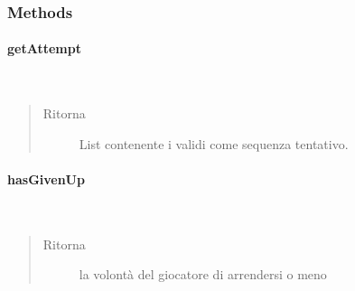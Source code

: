 \documentclass[letterpaper,10pt,italian,openany,oneside]{sphinxmanual}
\begin{document}
\subsubsection{Methods}
\label{\detokenize{test/it/unicam/cs/pa/mastermind/players/CodeBreaker:methods}}

\paragraph{getAttempt}
\label{\detokenize{test/it/unicam/cs/pa/mastermind/players/CodeBreaker:getattempt}}

\begin{fulllineitems}
\label{\detokenize{test/it/unicam/cs/pa/mastermind/players/CodeBreaker:it.unicam.cs.pa.mastermind.players.CodeBreaker.getAttempt()}}~\begin{quote}\begin{description}
\item[{Ritorna}] \leavevmode
List contenente i  validi come sequenza tentativo.

\end{description}\end{quote}

\end{fulllineitems}



\paragraph{hasGivenUp}
\label{\detokenize{test/it/unicam/cs/pa/mastermind/players/CodeBreaker:hasgivenup}}

\begin{fulllineitems}
\label{\detokenize{test/it/unicam/cs/pa/mastermind/players/CodeBreaker:it.unicam.cs.pa.mastermind.players.CodeBreaker.hasGivenUp()}}~\begin{quote}\begin{description}
\item[{Ritorna}] \leavevmode
la volontà del giocatore  di arrendersi o meno

\end{description}\end{quote}

\end{fulllineitems}
\end{document}
